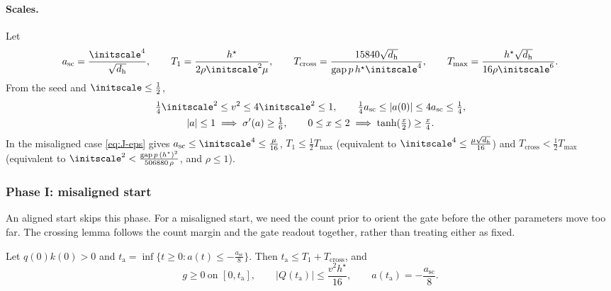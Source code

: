 \paragraph{Scales.} Let
\[
 a_{\mathrm{sc}}=\frac{\initscale^4}{\sqrt{d_{\mathrm h}}},\qquad T_1=\frac{h^\star}{2\rho\initscale^2\mu},\qquad
 T_{\mathrm{cross}}=\frac{15840\sqrt{d_{\mathrm h}}}{\mathrm{gap}\,p\,h^\star\initscale^4},\qquad T_{\max}=\frac{h^\star\sqrt{d_{\mathrm h}}}{16\rho\initscale^6}.
\]
From the seed and $\initscale\le\frac{1}{2}$,
\begin{equation}
 \begin{gathered}
 \tfrac{1}{4}\initscale^2\le v^2\le4\initscale^2\le1,\qquad \tfrac{1}{4}a_{\mathrm{sc}}\le|a(0)|\le4a_{\mathrm{sc}}\le\tfrac{1}{4},\\
 |a|\le1\implies\sigma'(a)\ge\tfrac{1}{6},\qquad 0\le x\le2\implies\tanh(\tfrac{x}{2})\ge\tfrac{x}{4} .
 \end{gathered}
 \label{eq:J-scales}
\end{equation}
In the misaligned case \cref{eq:J-eps} gives $a_{\mathrm{sc}}\le\initscale^4\le\frac{\mu}{16}$, $T_1\le\frac{1}{2}T_{\max}$ (equivalent to $\initscale^4\le\frac{\mu\sqrt{d_{\mathrm h}}}{16}$) and
$T_{\mathrm{cross}}<\frac{1}{2}T_{\max}$ (equivalent to $\initscale^2<\frac{\mathrm{gap}\,p\,(h^\star)^2}{506880\,\rho}$, and $\rho\le1$).

\subsubsection{Phase I: misaligned start}

An aligned start skips this phase. For a misaligned start, we need the count prior to orient the gate before the other parameters
move too far. The crossing lemma follows the count margin and the gate readout together, rather than treating either as fixed.

\begin{lemma}[Crossing]
\label{lem:J-cross}
Let $q(0)k(0)>0$ and $t_{\mathrm a}=\inf\{t\ge0:a(t)\le-\frac{a_{\mathrm{sc}}}{8}\}$. Then $t_{\mathrm a}\le T_1+T_{\mathrm{cross}}$, and
\[
 g\ge0\ \text{on }[0,t_{\mathrm a}],\qquad |Q(t_{\mathrm a})|\le\frac{v^2h^\star}{16},\qquad a(t_{\mathrm a})=-\frac{a_{\mathrm{sc}}}{8}.
\]
\end{lemma}

